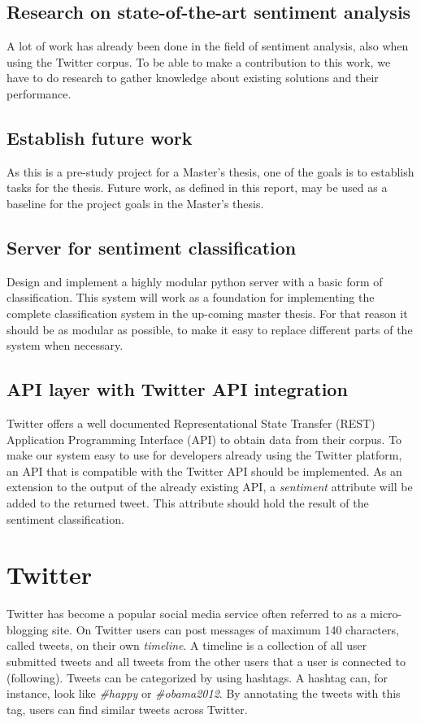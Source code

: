	\subsection{Research on state-of-the-art sentiment analysis}
	A lot of work has already been done in the field of sentiment analysis, also when using the Twitter corpus. To be able to make a contribution to this work, we have to do research to gather knowledge about existing solutions and their performance.
	
	\subsection{Establish future work}
	As this is a pre-study project for a Master's thesis, one of the goals is to establish tasks for the thesis. Future work, as defined in this report, may be used as a baseline for the project goals in the Master's thesis.
	
	\subsection{Server for sentiment classification}
	Design and implement a highly modular python server with a basic form of classification. This system will work as a foundation for implementing the complete classification system in the up-coming master thesis. For that reason it should be as modular as possible, to make it easy to replace different parts of the system when necessary.

	\subsection{API layer with Twitter API integration}
	Twitter offers a well documented Representational State Transfer (REST) Application Programming Interface (API) to obtain data from their corpus. To make our system easy to use for developers already using the Twitter platform, an API that is compatible with the Twitter API should be implemented. As an extension to the output of the already existing API, a \emph{sentiment} attribute will be added to the returned tweet. This attribute should hold the result of the sentiment classification.
	

\section{Twitter}

Twitter has become a popular social media service often referred to as a micro-blogging site. On Twitter users can post messages of maximum 140 characters, called tweets, on their own \emph{timeline}. A timeline is a collection of all user submitted tweets and all tweets from the other users that a user is connected to (following). Tweets can be categorized by using hashtags. A hashtag can, for instance, look like \emph{\#happy} or \emph{\#obama2012}. By annotating the tweets with this tag, users can find similar tweets across Twitter.

